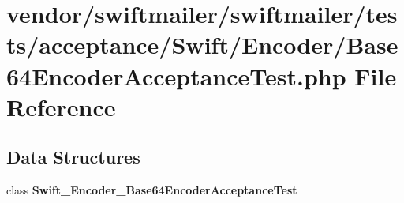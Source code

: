 \section{vendor/swiftmailer/swiftmailer/tests/acceptance/\+Swift/\+Encoder/\+Base64\+Encoder\+Acceptance\+Test.php File Reference}
\label{_base64_encoder_acceptance_test_8php}
\subsection*{Data Structures}
\begin{DoxyCompactItemize}
\item 
class {\bf Swift\+\_\+\+Encoder\+\_\+\+Base64\+Encoder\+Acceptance\+Test}
\end{DoxyCompactItemize}

